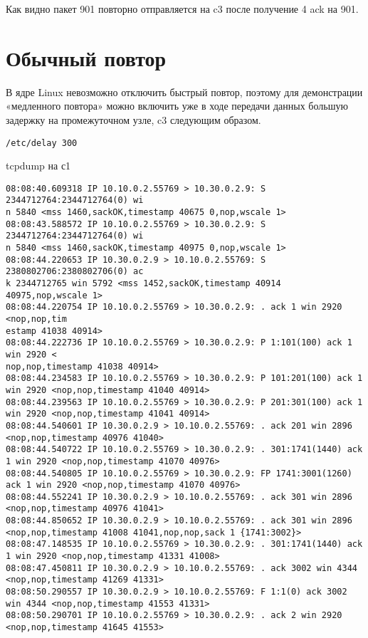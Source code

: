 \documentclass[a4paper,12pt]{article}
\begin{document}
Как видно пакет 901 повторно отправляется на c3 после получение 4 ack на 901.

\section{Обычный повтор}

В ядре Linux невозможно отключить быстрый повтор, поэтому для демонстрации 
«медленного повтора» можно включить уже в ходе передачи данных большую задержку
на промежуточном узле, c3 следующим образом.
\begin{Verbatim}
/etc/delay 300
\end{Verbatim}

tcpdump на с1
\begin{Verbatim}
08:08:40.609318 IP 10.10.0.2.55769 > 10.30.0.2.9: S 2344712764:2344712764(0) wi
n 5840 <mss 1460,sackOK,timestamp 40675 0,nop,wscale 1>
08:08:43.588572 IP 10.10.0.2.55769 > 10.30.0.2.9: S 2344712764:2344712764(0) wi
n 5840 <mss 1460,sackOK,timestamp 40975 0,nop,wscale 1>
08:08:44.220653 IP 10.30.0.2.9 > 10.10.0.2.55769: S 2380802706:2380802706(0) ac
k 2344712765 win 5792 <mss 1452,sackOK,timestamp 40914 40975,nop,wscale 1>
08:08:44.220754 IP 10.10.0.2.55769 > 10.30.0.2.9: . ack 1 win 2920 <nop,nop,tim
estamp 41038 40914>
08:08:44.222736 IP 10.10.0.2.55769 > 10.30.0.2.9: P 1:101(100) ack 1 win 2920 <
nop,nop,timestamp 41038 40914>
08:08:44.234583 IP 10.10.0.2.55769 > 10.30.0.2.9: P 101:201(100) ack 1 win 2920 <nop,nop,timestamp 41040 40914>
08:08:44.239563 IP 10.10.0.2.55769 > 10.30.0.2.9: P 201:301(100) ack 1 win 2920 <nop,nop,timestamp 41041 40914>
08:08:44.540601 IP 10.30.0.2.9 > 10.10.0.2.55769: . ack 201 win 2896 <nop,nop,timestamp 40976 41040>
08:08:44.540722 IP 10.10.0.2.55769 > 10.30.0.2.9: . 301:1741(1440) ack 1 win 2920 <nop,nop,timestamp 41070 40976>
08:08:44.540805 IP 10.10.0.2.55769 > 10.30.0.2.9: FP 1741:3001(1260) ack 1 win 2920 <nop,nop,timestamp 41070 40976>
08:08:44.552241 IP 10.30.0.2.9 > 10.10.0.2.55769: . ack 301 win 2896 <nop,nop,timestamp 40976 41041>
08:08:44.850652 IP 10.30.0.2.9 > 10.10.0.2.55769: . ack 301 win 2896 <nop,nop,timestamp 41008 41041,nop,nop,sack 1 {1741:3002}>
08:08:47.148535 IP 10.10.0.2.55769 > 10.30.0.2.9: . 301:1741(1440) ack 1 win 2920 <nop,nop,timestamp 41331 41008>
08:08:47.450811 IP 10.30.0.2.9 > 10.10.0.2.55769: . ack 3002 win 4344 <nop,nop,timestamp 41269 41331>
08:08:50.290557 IP 10.30.0.2.9 > 10.10.0.2.55769: F 1:1(0) ack 3002 win 4344 <nop,nop,timestamp 41553 41331>
08:08:50.290701 IP 10.10.0.2.55769 > 10.30.0.2.9: . ack 2 win 2920 <nop,nop,timestamp 41645 41553>
\end{Verbatim}
\end{document}

